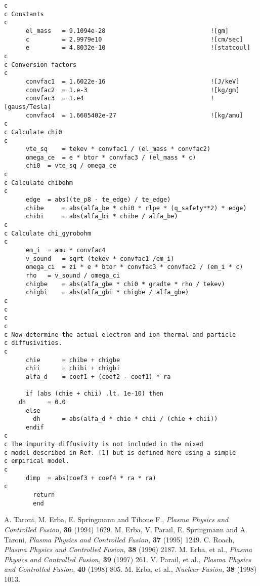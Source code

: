 \documentclass{article}    %
\begin{document}
\begin{verbatim}
c
c Constants
c
      el_mass   = 9.1094e-28                             ![gm]
      c         = 2.9979e10                              ![cm/sec]
      e         = 4.8032e-10                             ![statcoul]
c
c Conversion factors
c
      convfac1 	= 1.6022e-16                             ![J/keV]
      convfac2 	= 1.e-3                                  ![kg/gm]
      convfac3 	= 1.e4                                   ![gauss/Tesla]
      convfac4 	= 1.6605402e-27                          ![kg/amu]
c
c Calculate chi0
c
      vte_sq 	= tekev * convfac1 / (el_mass * convfac2)
      omega_ce 	= e * btor * convfac3 / (el_mass * c)
      chi0 	= vte_sq / omega_ce
c
c Calculate chibohm
c
      edge 	= abs((te_p8 - te_edge) / te_edge)
      chibe 	= abs(alfa_be * chi0 * rlpe * (q_safety**2) * edge) 
      chibi 	= abs(alfa_bi * chibe / alfa_be)
c
c Calculate chi_gyrobohm
c
      em_i 	= amu * convfac4
      v_sound 	= sqrt (tekev * convfac1 /em_i)         
      omega_ci 	= zi * e * btor * convfac3 * convfac2 / (em_i * c)
      rho 	= v_sound / omega_ci
      chigbe 	= abs(alfa_gbe * chi0 * gradte * rho / tekev)
      chigbi 	= abs(alfa_gbi * chigbe / alfa_gbe)
c
c
c
c
c Now determine the actual electron and ion thermal and particle 
c diffusivities.
c
      chie      = chibe + chigbe
      chii      = chibi + chigbi
      alfa_d    = coef1 + (coef2 - coef1) * ra
	
      if (abs (chie + chii) .lt. 1e-10) then
	dh      = 0.0
      else			
        dh      = abs(alfa_d * chie * chii / (chie + chii))
      endif
c
c The impurity diffusivity is not included in the mixed
c model described in Ref. [1] but is defined here using a simple
c empirical model.
c
      dimp 	= abs(coef3 + coef4 * ra * ra)
c
      	return
      	end
\end{verbatim}


\begin{thebibliography}{99}
A. Taroni, M. Erba, E. Springmann and Tibone F.,
{\em Plasma Physics and Controlled Fusion,} {\bf 36} (1994) 1629.
M. Erba, V. Parail, E. Springmann and A. Taroni,
{\em Plasma Physics and Controlled Fusion,} {\bf 37} (1995) 1249.
C. Roach,
{\em Plasma Physics and Controlled Fusion,} {\bf 38} (1996) 2187.
M. Erba, et al.,
{\em Plasma Physics and Controlled Fusion,} {\bf 39} (1997) 261.
V. Parail, et al.,
{\em Plasma Physics and Controlled Fusion,} {\bf 40} (1998) 805.
M. Erba, et al.,
{\em Nuclear Fusion,} {\bf 38} (1998) 1013.
\end{thebibliography}

\end{document}
